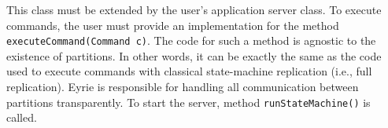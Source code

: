 \documentclass[10pt, conference, compsocconf, letterpaper]{IEEEtranv17}
\begin{document}
This class must be extended by the user's application server class. To execute commands, the user must provide an implementation for the method \verb#executeCommand(Command c)#. The code for such a method is agnostic to the existence of partitions. In other words, it can be exactly the same as the code used to execute commands with classical state-machine replication (i.e., full replication).
Eyrie is responsible for handling all communication between partitions transparently. 
To start the server, method \verb#runStateMachine()# is called.




%
\end{document}
